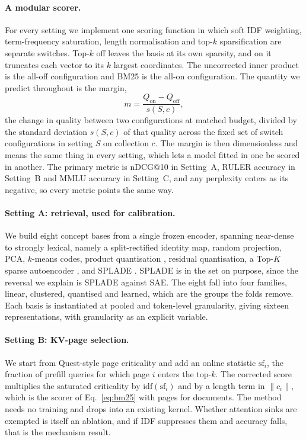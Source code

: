 \documentclass[11pt]{article}
\newcommand{\idf}{\mathrm{idf}}
\newcommand{\sfreq}{\mathrm{sf}}
\begin{document}
\paragraph{A modular scorer.} For every setting we implement one scoring function
in which soft IDF weighting, term-frequency saturation, length normalisation and
top-$k$ sparsification are separate switches. Top-$k$ off leaves the basis at its own
sparsity, and on it truncates each vector to its $k$ largest coordinates. The uncorrected
inner product is the all-off configuration and BM25 is the all-on configuration. The quantity we predict
throughout is the margin,
\begin{equation}
m = \frac{Q_{\mathrm{on}} - Q_{\mathrm{off}}}{s(S,c)},
\end{equation}
the change in quality between two configurations at matched budget, divided by the
standard deviation $s(S,c)$ of that quality across the fixed set of switch
configurations in setting $S$ on collection $c$. The margin is then dimensionless
and means the same thing in every setting, which lets a model fitted in one
be scored in another. The primary metric is nDCG@10 in Setting~A, RULER accuracy in
Setting~B and MMLU accuracy in Setting~C, and any perplexity enters as its negative,
so every metric points the same way.

\paragraph{Setting A: retrieval, used for calibration.} We build eight concept bases
from a single frozen encoder, spanning near-dense to strongly lexical, namely a
split-rectified identity map, random projection, PCA, $k$-means codes, product
quantisation \citep{jegou2011pq}, residual quantisation, a Top-$K$ sparse
autoencoder \citep{gao2025topksae}, and SPLADE
\citep{formal2021splade,lassance2024spladev3}. SPLADE is in the set on purpose,
since the reversal we explain is SPLADE against SAE. The eight fall into four families, linear,
clustered, quantised and learned, which are the groups the folds remove. Each basis
is instantiated at pooled and token-level granularity, giving sixteen
representations, with granularity as an explicit variable.

\paragraph{Setting B: KV-page selection.} We start from Quest-style page criticality
\citep{tang2024quest} and add an online statistic $\sfreq_i$, the fraction of
prefill queries for which page $i$ enters the top-$k$. The corrected score
multiplies the saturated criticality by $\idf(\sfreq_i)$ and by a length term in
$\|c_i\|$, which is the scorer of Eq.~\eqref{eq:bm25} with pages for documents. The
method needs no training and drops into an existing kernel. Whether attention sinks
are exempted is itself an ablation, and if IDF suppresses them and
accuracy falls, that is the mechanism result.
\end{document}
